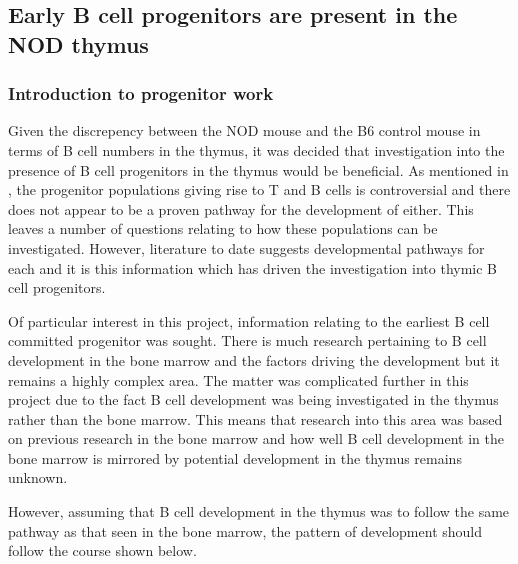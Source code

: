 \subsection{Early B cell progenitors are present in the NOD thymus}

\subsubsection{Introduction to progenitor work}

Given the discrepency between the NOD mouse and the B6 control mouse in terms of B cell numbers in the thymus, it was decided that investigation into the presence of B cell progenitors in the thymus would be beneficial.
As mentioned in , the progenitor populations giving rise to T and B cells is controversial and there does not appear to be a proven pathway for the development of either.
This leaves a number of questions relating to how these populations can be investigated.
However, literature to date suggests developmental pathways for each and it is this information which has driven the investigation into thymic B cell progenitors.

Of particular interest in this project, information relating to the earliest B cell committed progenitor was sought.
There is much research pertaining to B cell development in the bone marrow and the factors driving the development but it remains a highly complex area.
The matter was complicated further in this project due to the fact B cell development was being investigated in the thymus rather than the bone marrow.
This means that research into this area was based on previous research in the bone marrow and how well B cell development in the bone marrow is mirrored by potential development in the thymus remains unknown.

 However, assuming that B cell development in the thymus was to follow the same pathway as that seen in the bone marrow, the pattern of development should follow the course shown below.

 


